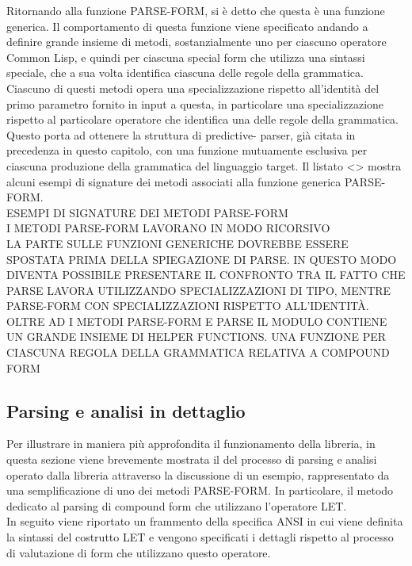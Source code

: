 Ritornando alla funzione PARSE-FORM, si è detto che questa è una funzione
generica. Il comportamento di questa funzione viene specificato andando a
definire grande insieme di metodi, sostanzialmente uno per ciascuno operatore
Common Lisp, e quindi per ciascuna special form che utilizza una sintassi
speciale, che a sua volta identifica ciascuna delle regole della grammatica.
Ciascuno di questi metodi opera una specializzazione rispetto all’identità del
primo parametro fornito in input a questa,  in particolare una
specializzazione rispetto al particolare operatore che identifica una delle
regole della grammatica. Questo porta ad ottenere la struttura di predictive-
parser, già citata in precedenza in questo capitolo, con una funzione
mutuamente esclusiva per ciascuna produzione della grammatica del linguaggio
target. Il listato <> mostra alcuni esempi di signature dei metodi associati
alla funzione generica PARSE-FORM.\\

ESEMPI DI SIGNATURE DEI METODI PARSE-FORM\\

I METODI PARSE-FORM LAVORANO IN MODO RICORSIVO\\

LA PARTE SULLE FUNZIONI GENERICHE DOVREBBE ESSERE SPOSTATA PRIMA DELLA
SPIEGAZIONE DI PARSE. IN QUESTO MODO DIVENTA POSSIBILE PRESENTARE IL CONFRONTO
TRA IL FATTO CHE PARSE LAVORA UTILIZZANDO SPECIALIZZAZIONI DI TIPO, MENTRE
PARSE-FORM CON SPECIALIZZAZIONI RISPETTO ALL’IDENTITÀ.\\

OLTRE AD I METODI PARSE-FORM E PARSE IL MODULO CONTIENE UN GRANDE INSIEME DI
HELPER FUNCTIONS. UNA FUNZIONE PER CIASCUNA REGOLA DELLA GRAMMATICA RELATIVA A
COMPOUND FORM

\subsection{Parsing e analisi in dettaglio}

Per illustrare in maniera più approfondita il funzionamento della libreria, in
questa sezione viene brevemente mostrata il del processo di parsing e analisi
operato dalla libreria attraverso la discussione di un esempio, rappresentato
da una semplificazione di uno dei metodi PARSE-FORM. In particolare, il metodo
dedicato al parsing di compound form che utilizzano l’operatore LET.\\

In seguito viene riportato un frammento della specifica ANSI in cui viene
definita la sintassi del costrutto LET e vengono specificati i dettagli
rispetto al processo di valutazione di form che utilizzano questo operatore.\\

